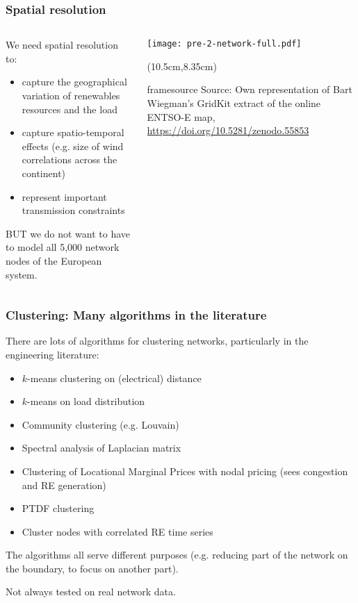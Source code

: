\documentclass[10pt,aspectratio=169,dvipsnames]{beamer}
\newcommand{\source}[1]{\begin{textblock*}{5cm}(10.5cm,8.35cm)
    \begin{beamercolorbox}[ht=0.5cm,right]{framesource}
        \usebeamerfont{framesource}\usebeamercolor[fg]{framesource} Source: {#1}
    \end{beamercolorbox}
\end{textblock*}}
\let\olditem\item
\renewcommand{\item}{%
\olditem\vspace{5pt}}
\begin{document}
\begin{frame}
  \frametitle{Spatial resolution}

\begin{columns}
\begin{column}{7cm}
We need spatial resolution to:
\begin{itemize}
\item capture the \alert{geographical variation} of renewables resources and the load
\item capture \alert{spatio-temporal effects} (e.g. size of wind correlations across the continent)
\item represent important \alert{transmission constraints}
\end{itemize}

BUT we do not want to have to model all 5,000 network nodes of the European system.
\end{column}
\begin{column}{6cm}
\centering
\texttt{[image: pre-2-network-full.pdf]}
\source{Own representation of Bart Wiegman's GridKit extract of the
  online ENTSO-E map, \url{https://doi.org/10.5281/zenodo.55853}}
\end{column}
\end{columns}
\end{frame}

\begin{frame}
  \frametitle{Clustering: Many algorithms in the literature}

  There are lots of algorithms for clustering networks, particularly in the engineering literature:
  \begin{itemize}
    \item $k$-means clustering on (electrical) distance
    \item $k$-means on load distribution
    \item Community clustering (e.g. Louvain)
    \item Spectral analysis of Laplacian matrix
    \item Clustering of Locational Marginal Prices with nodal pricing (sees congestion and RE generation)
    \item PTDF clustering
    \item Cluster nodes with correlated RE time series
  \end{itemize}

  The algorithms all serve different purposes (e.g. reducing part of
  the network on the boundary, to focus on another part).

  Not always tested on real network data.
\end{frame}
\end{document}
